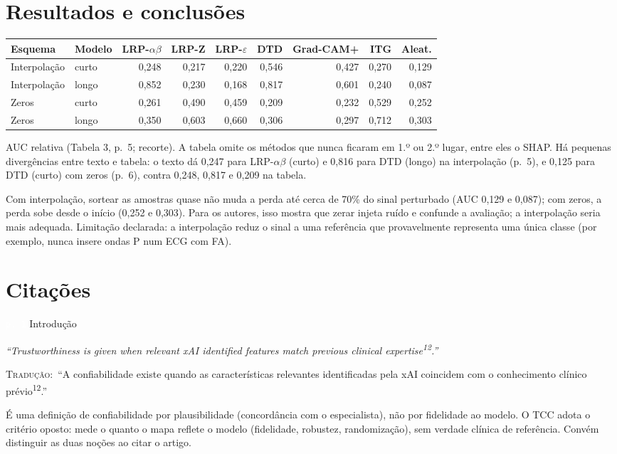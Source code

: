 \documentclass[11pt,a4paper]{article}
\newcommand{\pagechip}[1]{{\setlength{\fboxsep}{1.5pt}\colorbox{cAcc}{\textcolor{white}{\scriptsize\texttt{#1}}}}}
\newenvironment{origquote}{\par\itshape\small}{\par}
\newenvironment{tradquote}{\par\small\textsc{Tradução:}\ }{\par}
\newcommand{\explab}[1]{\par\smallskip{\small\color{cAcc}\textbf{\MakeUppercase{#1}}}\par}
\begin{document}
\section{Resultados e conclusões}
\begin{center}
\small
\begin{tabular}{llrrrrrrr}
\toprule
Esquema & Modelo & LRP-$\alpha\beta$ & LRP-Z & LRP-$\varepsilon$ & DTD & Grad-CAM+ & ITG & Aleat. \\
\midrule
Interpolação & curto & 0,248 & 0,217 & 0,220 & 0,546 & 0,427 & 0,270 & 0,129 \\
Interpolação & longo & 0,852 & 0,230 & 0,168 & 0,817 & 0,601 & 0,240 & 0,087 \\
Zeros & curto & 0,261 & 0,490 & 0,459 & 0,209 & 0,232 & 0,529 & 0,252 \\
Zeros & longo & 0,350 & 0,603 & 0,660 & 0,306 & 0,297 & 0,712 & 0,303 \\
\bottomrule
\end{tabular}
\end{center}
{\small AUC relativa (Tabela 3, p.~5; recorte). A tabela omite os métodos que nunca ficaram em 1.º ou 2.º lugar, entre eles o SHAP. Há pequenas divergências entre texto e tabela: o texto dá 0,247 para LRP-$\alpha\beta$ (curto) e 0,816 para DTD (longo) na interpolação (p.~5), e 0,125 para DTD (curto) com zeros (p.~6), contra 0,248, 0,817 e 0,209 na tabela.}

Com interpolação, sortear as amostras quase não muda a perda até cerca de 70\% do sinal perturbado (AUC 0,129 e 0,087); com zeros, a perda sobe desde o início (0,252 e 0,303). Para os autores, isso mostra que zerar injeta ruído e confunde a avaliação; a interpolação seria mais adequada. Limitação declarada: a interpolação reduz o sinal a uma referência que provavelmente representa uma única classe (por exemplo, nunca insere ondas P num ECG com FA).

\section{Citações}

\begin{citacard}{\pagechip{p. 1} Introdução}
\begin{origquote}“Trustworthiness is given when relevant xAI identified features match previous clinical expertise\textsuperscript{12}.”\end{origquote}
\begin{tradquote}“A confiabilidade existe quando as características relevantes identificadas pela xAI coincidem com o conhecimento clínico prévio\textsuperscript{12}.”\end{tradquote}
\explab{Explicação}
É uma definição de confiabilidade por plausibilidade (concordância com o especialista), não por fidelidade ao modelo. O TCC adota o critério oposto: mede o quanto o mapa reflete o modelo (fidelidade, robustez, randomização), sem verdade clínica de referência. Convém distinguir as duas noções ao citar o artigo.
\end{citacard}
\end{document}
